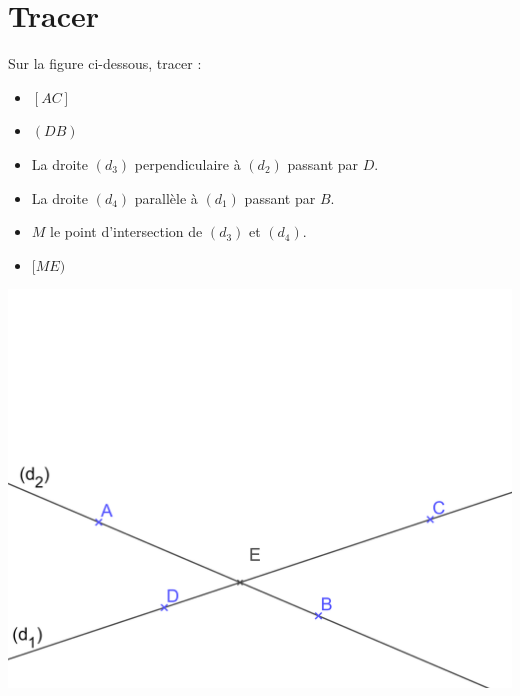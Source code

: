 \documentclass[a4paper,12pt]{exam}
\begin{document}
\newpage


\section{Tracer}

Sur la figure ci-dessous, tracer :

\begin{itemize}
	\item $[AC]$
	\item $(DB)$
	\item La droite $(d_3)$ perpendiculaire à $(d_2)$ passant par $D$.
	\item La droite $(d_4)$ parallèle à $(d_1)$ passant par $B$. 
	\item $M$ le point d'intersection de $(d_3)$ et $(d_4)$.
	\item $[ME)$

\end{itemize}

\vspace*{3cm}
\begin{center}
	\includegraphics[scale=0.2]{img/fig}	
\end{center}




\label{LastPage}
\end{document}

